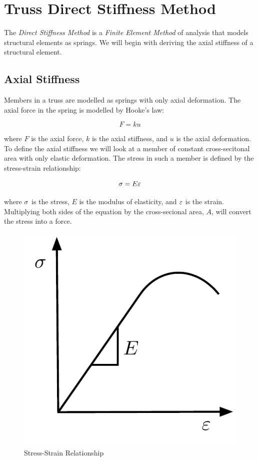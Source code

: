 \section{Truss Direct Stiffness Method}



The \textit{Direct Stiffness Method} is a \textit{Finite Element Method} of analysis that models structural elements as springs. We will begin with deriving the axial stiffness of a structural element. \cite{Felippa2000}

\subsection{Axial Stiffness}
Members in a truss are modelled as springs with only axial deformation. The axial force in the spring is modelled by Hooke's law:

\begin{equation}
	F = k u
\end{equation}

where $F$ is the axial force, $k$ is the axial stiffness, and $u$ is the axial deformation. To define the axial stiffness we will look at a member of constant cross-secitonal area with only elastic deformation. The stress in such a member is defined by the stress-strain relationship:

\begin{equation}
	\sigma = E \varepsilon
\end{equation}

where $\sigma$ is the stress, $E$ is the modulus of elasticity, and $\varepsilon$ is the strain. Multiplying both sides of the equation by the cross-secional area, $A$, will convert the stress into a force.

\begin{figure}[H]	\centerline{\includegraphics[width=0.5\columnwidth]{Figures/Stress-Strain}}
	\caption{Stress-Strain Relationship}
	\label{fig:Stress-Strain}
\end{figure}

